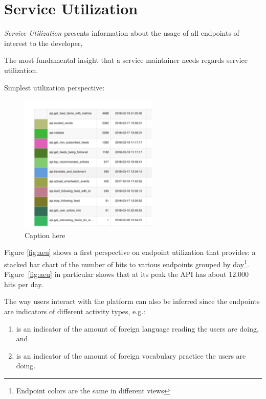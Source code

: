 \documentclass[conference]{IEEEtran}
\begin{document}
\newpage
\section{Service Utilization}
\label{sec:util}


\textit{Service Utilization} presents information about the usage of all endpoints of interest to the developer,

The most fundamental insight that a service maintainer needs regards service utilization. %

Simplest utilization perspective:

\begin{figure}[h!]
  \centering
  \includegraphics[width=0.5\linewidth]{endpoint-call-count}
  \caption{Caption here}
  \label{fig:figure1}
\end{figure}



Figure \ref{fig:aeu} shows a first perspective on endpoint utilization that \tool provides: a stacked bar chart of the number of hits to various endpoints grouped by day\footnote{Endpoint colors are the same in different views}. Figure~\ref{fig:aeu} in particular shows that at its peak the API has about 12.000 hits per day. 

The way users interact with the platform can also be inferred since the endpoints are indicators of different activity types, e.g.: 

\begin{enumerate}
  
  \item {\color{myred} \epTranslations} is an indicator of the amount of foreign language reading the users are doing, and 
  
  \item {\color{mygreen} \epOutcome} is an indicator of the amount of foreign vocabulary practice the users are doing.
  
\end{enumerate}
\end{document}
